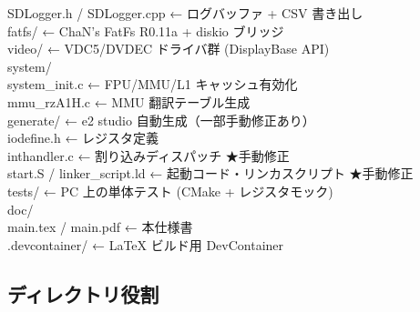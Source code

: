 \documentclass[a4paper,11pt,dvipdfmx]{jsarticle}
\begin{document}
\begin{tcolorbox}[colback=codebg, colframe=accentblue!40, arc=2mm]
\begin{tabbing}
\>\>\> SDLogger.h / SDLogger.cpp \quad\textrm{\color{gray}← ログバッファ + CSV 書き出し} \\
\>\>\> fatfs/ \quad\textrm{\color{gray}← ChaN's FatFs R0.11a + diskio ブリッジ} \\
\>\>\> video/ \quad\textrm{\color{gray}← VDC5/DVDEC ドライバ群 (DisplayBase API)} \\
\>\> system/ \\
\>\>\> system\_init.c \quad\textrm{\color{gray}← FPU/MMU/L1 キャッシュ有効化} \\
\>\>\> mmu\_rzA1H.c \quad\textrm{\color{gray}← MMU 翻訳テーブル生成} \\
\> generate/ \quad\textrm{\color{gray}← e2 studio 自動生成（一部手動修正あり）} \\
\>\> iodefine.h \quad\textrm{\color{gray}← レジスタ定義} \\
\>\> inthandler.c \quad\textrm{\color{gray}← 割り込みディスパッチ ★手動修正} \\
\>\> start.S / linker\_script.ld \quad\textrm{\color{gray}← 起動コード・リンカスクリプト ★手動修正} \\
\> tests/ \quad\textrm{\color{gray}← PC 上の単体テスト (CMake + レジスタモック)} \\
\> doc/ \\
\>\> main.tex / main.pdf \quad\textrm{\color{gray}← 本仕様書} \\
\> .devcontainer/ \quad\textrm{\color{gray}← LaTeX ビルド用 DevContainer} \\
\end{tabbing}
\end{tcolorbox}

\subsection{ディレクトリ役割}
\end{document}
